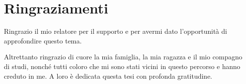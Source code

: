 \chapter*{Ringraziamenti}
Ringrazio il mio relatore per il supporto e per avermi dato l'opportunità di approfondire questo tema.

Altrettanto ringrazio di cuore la mia famiglia, la mia ragazza e il mio compagno di studi, nonché tutti coloro che mi sono
stati vicini in questo percorso e hanno creduto in me. A loro è dedicata questa tesi con profonda gratitudine.